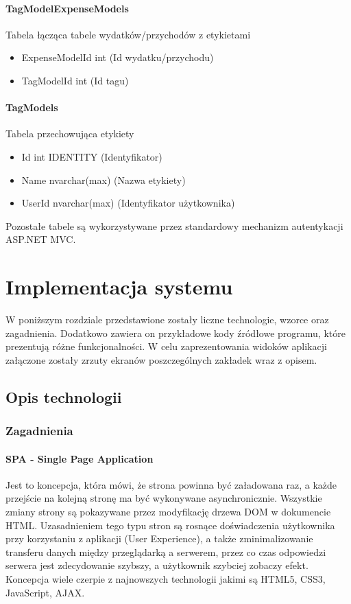 \documentclass[10pt,titlepage]{article}
\begin{document}
\paragraph[short]{TagModelExpenseModels}
Tabela łącząca tabele wydatków/przychodów z etykietami
\begin{itemize}
  \item ExpenseModelId int (Id wydatku/przychodu)
  \item TagModelId int (Id tagu)
\end{itemize}
\paragraph[short]{TagModels}
Tabela przechowująca etykiety
\begin{itemize}
  \item Id int IDENTITY (Identyfikator)
  \item Name nvarchar(max) (Nazwa etykiety)
  \item UserId nvarchar(max) (Identyfikator użytkownika)
\end{itemize}
Pozostałe tabele są wykorzystywane przez standardowy mechanizm autentykacji ASP.NET MVC.
\section{Implementacja systemu}
W poniższym rozdziale przedstawione zostały liczne technologie, wzorce oraz zagadnienia. Dodatkowo zawiera on przykładowe kody źródłowe programu, które prezentują różne funkcjonalności. W celu zaprezentowania widoków aplikacji załączone zostały zrzuty ekranów poszczególnych zakładek wraz z opisem.
\subsection{Opis technologii}
\subsubsection{Zagadnienia}
\paragraph{SPA - Single Page Application}
Jest to koncepcja, która mówi, że strona powinna być załadowana raz, a każde przejście na kolejną stronę ma być wykonywane asynchronicznie. Wszystkie zmiany strony są pokazywane przez modyfikację drzewa DOM w dokumencie HTML. Uzasadnieniem tego typu stron są rosnące doświadczenia użytkownika przy korzystaniu z aplikacji (User Experience), a także zminimalizowanie transferu danych między przeglądarką a serwerem, przez co czas odpowiedzi serwera jest zdecydowanie szybszy, a użytkownik szybciej zobaczy efekt. Koncepcja wiele czerpie z najnowszych technologii jakimi są HTML5, CSS3, JavaScript, AJAX.
\end{document}
